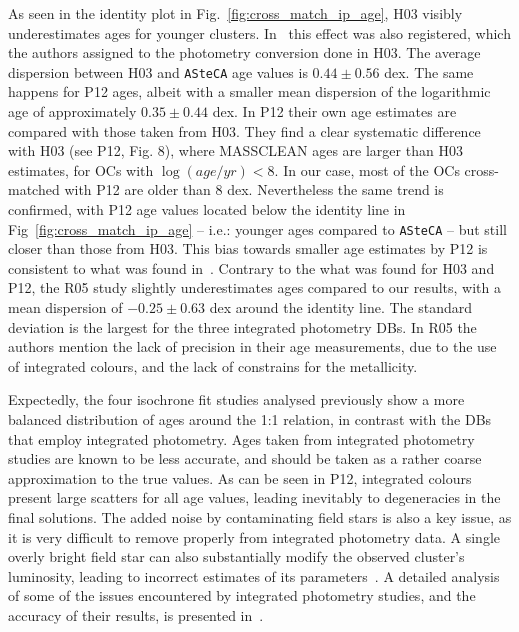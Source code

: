 \documentclass[a4paper,fleqn,usenatbib]{mnras}
\begin{document}
As seen in the identity plot in Fig.~\ref{fig:cross_match_ip_age}, H03
visibly underestimates ages for younger clusters.
In~\citet[][see Fig. 1]{de_Grijs_2006} this effect was also registered, which
the authors assigned to the photometry conversion done in H03. The average
dispersion between H03 and \texttt{ASteCA} age values is $0.44\pm0.56$ dex.
%
The same happens for P12 ages, albeit with a smaller mean dispersion of
the logarithmic age of approximately $0.35\pm0.44$ dex.
In P12 their own age estimates are compared with those taken from H03.
They find a clear systematic difference with H03 (see P12, Fig. 8),
where MASSCLEAN ages are larger than H03 estimates, for OCs with
$\log(age/yr)<8.$ In our case, most of the OCs cross-matched with P12 are older
than 8 dex. Nevertheless the same trend is confirmed, with P12 age values
located below the identity line in Fig~\ref{fig:cross_match_ip_age} -- i.e.:
younger ages compared to \texttt{ASteCA} -- but still closer than those from
H03. This bias towards smaller age estimates by P12 is consistent to what was
found in~\cite{Choudhury_2015}.
%
Contrary to the what was found for H03 and P12, the R05 study slightly
underestimates ages compared to our results, with a mean dispersion of
$-0.25\pm0.63$ dex around the identity line. The standard deviation is the
largest for the three integrated photometry DBs. In R05 the authors mention
the lack of precision in their age measurements, due to the use of integrated
colours, and the lack of constrains for the metallicity.

Expectedly, the four isochrone fit studies analysed previously show a more
balanced distribution of ages around the 1:1 relation, in contrast with the DBs
that employ integrated photometry.
%
Ages taken from integrated photometry studies are known to be less
accurate, and should be taken as a rather coarse approximation to the true
values.
As can be seen in P12, integrated colours present large scatters for
all age values, leading inevitably to degeneracies in the final solutions.
The added noise by contaminating field stars is also a key issue, as it is
very difficult to remove properly from integrated photometry data. A
single overly bright field star can also substantially modify the observed
cluster's luminosity, leading to incorrect estimates of its
parameters~\citep{Baumgardt_2013,Piatti_2014_B88}.
A detailed analysis of some of the issues encountered by integrated photometry
studies, and the accuracy of their results, is presented
in~\cite{Anders_2013}.\\
\end{document}
